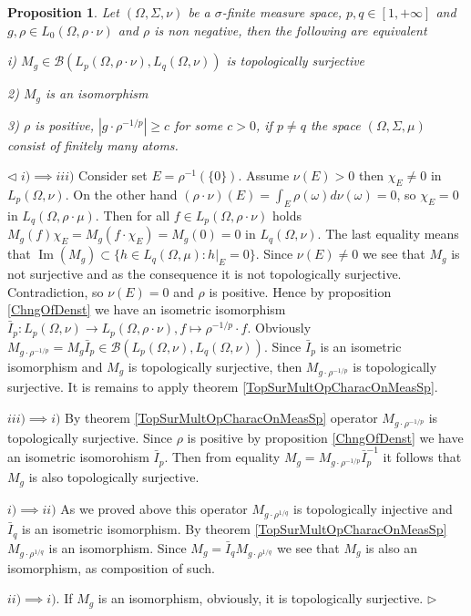 \documentclass[12pt]{article}
\newtheorem{proposition}[theorem]{Proposition}
\newenvironment{proof}{\par $\triangleleft$}{$\triangleright$}
\begin{document}
\begin{proposition}\label{TopSurMultOpCharacBtwnTwoContMeasSp} Let $(\Omega,\Sigma,\nu)$ be a $\sigma$-finite measure space, $p,q\in[1,+\infty]$ and $g,\rho\in L_0(\Omega,\rho\cdot\nu)$ and $\rho$ is non negative, then the following are equivalent

i) $M_g\in\mathcal{B}(L_p(\Omega,\rho\cdot\nu),L_q(\Omega,\nu))$ is topologically surjective

2) $M_g$ is an isomorphism

3) $\rho$ is positive, $|g\cdot \rho^{-1/p}|\geq c$ for some $c>0$, if $p\neq q$ the space $(\Omega,\Sigma,\mu)$ consist of finitely many atoms.
\end{proposition}
\begin{proof} $i)\implies iii)$ Consider set $E=\rho^{-1}(\{0\})$. Assume $\nu(E)>0$ then $\chi_E\neq 0$ in $L_p(\Omega,\nu)$. On the other hand $(\rho\cdot\nu)(E)=\int_E\rho(\omega)d\nu(\omega)=0$, so $\chi_E=0$ in $L_q(\Omega,\rho\cdot\mu)$. Then for all $f\in L_p(\Omega,\rho\cdot\nu)$ holds $M_g(f)\chi_E=M_g(f\cdot\chi_E)=M_g(0)=0$ in $L_q(\Omega,\nu)$. The last equality means that $\operatorname{Im}(M_g)\subset\{h\in L_q(\Omega,\mu): h|_E=0\}$. Since $\nu(E)\neq 0$ we see that $M_g$ is not surjective and as the consequence it is not topologically surjective. Contradiction, so $\nu(E)=0$ and $\rho$ is positive. Hence by proposition \ref{ChngOfDenst} we have an isometric isomorphism $\bar{I}_p:L_p(\Omega,\nu)\to L_p(\Omega,\rho\cdot\nu),f\mapsto \rho^{-1/p}\cdot f$. Obviously $M_{g\cdot\rho^{-1/p}}=M_g \bar{I}_p\in\mathcal{B}(L_p(\Omega,\nu),L_q(\Omega,\nu))$. Since $\bar{I}_p$ is an isometric isomorphism and $M_g$ is topologically surjective, then $M_{g\cdot \rho^{-1/p}}$ is topologically surjective. It is remains to apply theorem \ref{TopSurMultOpCharacOnMeasSp}.

$iii)\implies i)$ By theorem \ref{TopSurMultOpCharacOnMeasSp} operator $M_{g\cdot\rho^{-1/p}}$ is topologically surjective. Since $\rho$ is positive by proposition \ref{ChngOfDenst} we have an isometric isomorohism $\bar{I}_p$. Then from equality $M_g= M_{g\cdot\rho^{-1/p}}\bar{I}_p^{-1}$ it follows that $M_g$ is also topologically surjective.

$i)\implies ii)$ As we proved above this operator $M_{g\cdot\rho^{1/q}}$ is topologically injective and $\bar{I}_q$ is an isometric isomorphism. By theorem \ref{TopSurMultOpCharacOnMeasSp} $M_{g\cdot\rho^{1/q}}$ is an isomorphism. Since $M_g=\bar{I}_q M_{g\cdot\rho^{1/q}}$ we see that $M_g$ is also an isomorphism, as composition of such.

$ii)\implies i)$. If $M_g$ is an isomorphism, obviously, it is topologically surjective.
\end{proof}
\end{document}
